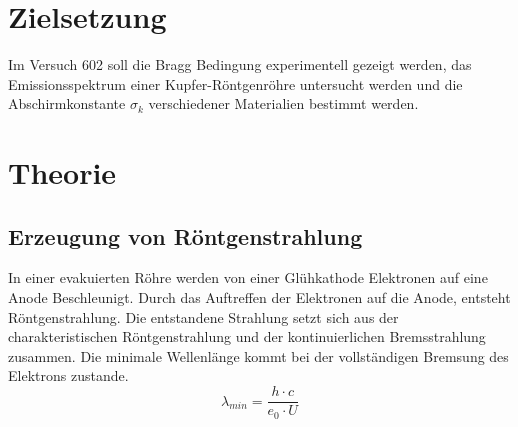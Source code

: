 \section{Zielsetzung}
\label{sec:Zielsetzung}

Im Versuch 602 soll die Bragg Bedingung experimentell gezeigt werden, das Emissionsspektrum einer Kupfer-Röntgenröhre untersucht werden
und die Abschirmkonstante $σ_k$ verschiedener Materialien bestimmt werden.

\section{Theorie}
\label{sec:Theorie}

\subsection{Erzeugung von Röntgenstrahlung}
\label{sec:Erzeugung_von_Roentgenstrahlung}

In einer evakuierten Röhre werden von einer Glühkathode Elektronen auf eine Anode Beschleunigt. 
Durch das Auftreffen der Elektronen auf die Anode, entsteht Röntgenstrahlung. Die entstandene Strahlung
setzt sich aus der charakteristischen Röntgenstrahlung und der kontinuierlichen Bremsstrahlung zusammen. 
Die minimale Wellenlänge kommt bei der vollständigen Bremsung des Elektrons zustande.\\
\begin{equation*}\label{eq:lambda_min}
    \lambda_{min} = \frac{h \cdot c}{e_0 \cdot U}
\end{equation*}

